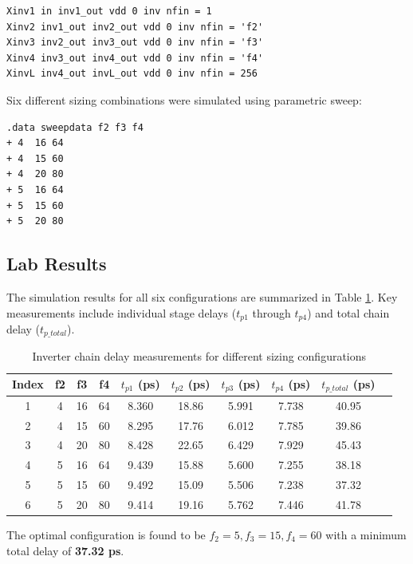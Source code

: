 \documentclass[UTF8,12pt,a4paper]{ctexart}
\begin{document}
\begin{lstlisting}
Xinv1 in inv1_out vdd 0 inv nfin = 1
Xinv2 inv1_out inv2_out vdd 0 inv nfin = 'f2'
Xinv3 inv2_out inv3_out vdd 0 inv nfin = 'f3'
Xinv4 inv3_out inv4_out vdd 0 inv nfin = 'f4'
XinvL inv4_out invL_out vdd 0 inv nfin = 256
\end{lstlisting}

Six different sizing combinations were simulated using parametric sweep:

\begin{lstlisting}
.data sweepdata f2 f3 f4
+ 4  16 64
+ 4  15 60
+ 4  20 80
+ 5  16 64
+ 5  15 60
+ 5  20 80
\end{lstlisting}

\subsection{Lab Results}

The simulation results for all six configurations are summarized in Table \ref{tab:task2_results}. Key measurements include individual stage delays ($t_{p1}$ through $t_{p4}$) and total chain delay ($t_{p\_total}$).

\begin{table}[h]
\centering
\small
\begin{tabular}{cccccccccc}
\toprule
\textbf{Index} & \textbf{f2} & \textbf{f3} & \textbf{f4} & \textbf{$t_{p1}$ (ps)} & \textbf{$t_{p2}$ (ps)} & \textbf{$t_{p3}$ (ps)} & \textbf{$t_{p4}$ (ps)} & \textbf{$t_{p\_total}$ (ps)} \\
\midrule
1 & 4 & 16 & 64 & 8.360 & 18.86 & 5.991 & 7.738 & 40.95 \\
2 & 4 & 15 & 60 & 8.295 & 17.76 & 6.012 & 7.785 & 39.86 \\
3 & 4 & 20 & 80 & 8.428 & 22.65 & 6.429 & 7.929 & 45.43 \\
4 & 5 & 16 & 64 & 9.439 & 15.88 & 5.600 & 7.255 & 38.18 \\
5 & 5 & 15 & 60 & 9.492 & 15.09 & 5.506 & 7.238 & 37.32 \\
6 & 5 & 20 & 80 & 9.414 & 19.16 & 5.762 & 7.446 & 41.78 \\
\bottomrule
\end{tabular}
\caption{Inverter chain delay measurements for different sizing configurations}
\label{tab:task2_results}
\end{table}

The optimal configuration is found to be \textbf{$f_2 = 5, f_3 = 15, f_4 = 60$} with a minimum total delay of \textbf{37.32 ps}.
\end{document}

